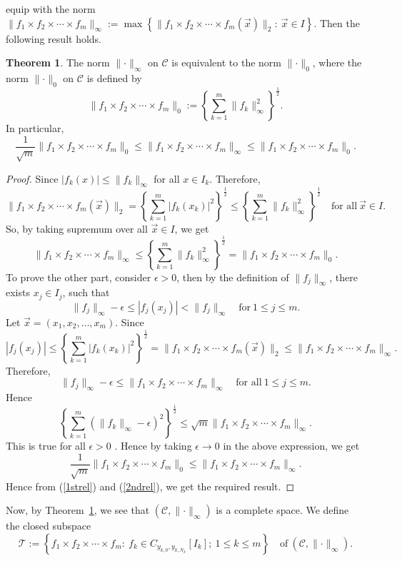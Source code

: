 \documentclass[10pt]{amsart}
\theoremstyle{definition}
\newtheorem{thm}{Theorem}[section]
\newcommand{\myseries}[3]{#1\leq #2\leq #3}
\newcommand{\myvec}[3]{#1=(#2_1,#2_2,\ldots,#2_#3)}
\newcommand{\norm}[2]{\lVert #1 \rVert_#2}
\newcommand{\profunc}[1]{#1_1\times#1_2\times\cdots\times#1_m}
\begin{document}
	equip with the norm $\norm{\profunc{f}}{\infty}:=\max\left\{\norm{\profunc{f}(\vec{x})}{2}:~\vec{x}\in I\right\}$. Then the following result holds.
	\begin{thm}\label{rbnonfs}
		The norm $\norm{\cdot}{\infty}$ on $\mathscr{C}$ is equivalent to the norm $\norm{\cdot}{0}$, where the norm $\norm{\cdot}{0}$ on $\mathscr{C}$ is defined by 
		$$\norm{\profunc{f}}{0}:=\left\{\sum_{k=1}^{m}\norm{f_k}{\infty}^2\right\}^{\frac{1}{2}}.$$
		In particular, $$\frac{1}{\sqrt{m}}\norm{\profunc{f}}{0}\leq \norm{\profunc{f}}{\infty}\leq \norm{\profunc{f}}{0}.$$
	\end{thm}
	\begin{proof}
		Since $|f_k(x)|\leq \norm{f_k}{\infty}$ for all $x\in I_k$. Therefore,
		$$\norm{\profunc{f}(\vec{x})}{2}=\left\{\sum_{k=1}^{m}|{f_k}(x_k)|^2\right\}^{\frac{1}{2}}\leq \left\{\sum_{k=1}^{m}\norm{f_k}{\infty}^2\right\}^{\frac{1}{2}}\quad\mbox{for all}~\vec{x}\in I.$$
		So, by taking supremum over all $\vec{x}\in I$, we get
		\begin{equation} 
			\norm{\profunc{f}}{\infty}\leq \left\{\sum_{k=1}^{m}\norm{f_k}{\infty}^2\right\}^{\frac{1}{2}}=\norm{\profunc{f}}{0}. \label{1strel}
		\end{equation}
		To prove the other part, consider $\epsilon>0$, then by the definition of $\norm{f_j}{\infty}$, there exists $x_j\in I_j$, such that 
		$$\norm{f_j}{\infty}-\epsilon\leq |f_j(x_j)|<\norm{f_j}{\infty}\quad\mbox{for}~\myseries{1}{j}{m}.$$
		Let $\myvec{\vec{x}}{x}{m}$. Since $$|f_j(x_j)|\leq \left\{\sum_{k=1}^{m}|{f_k}(x_k)|^2\right\}^{\frac{1}{2}}=\norm{\profunc{f}(\vec{x})}{2}\leq \norm{\profunc{f}}{\infty}.$$ 
		Therefore, 
		$$\norm{f_j}{\infty}-\epsilon\leq \norm{\profunc{f}}{\infty}\quad\mbox{for all}~ \myseries{1}{j}{m}.$$
		Hence
		$$\left\{\sum_{k=1}^{m}(\norm{f_k}{\infty}-\epsilon)^2\right\}^{\frac{1}{2}}\leq \sqrt{m}\norm{\profunc{f}}{\infty}.$$
		This is true for all $\epsilon>0$ . Hence by taking $\epsilon\rightarrow 0$ in the above expression, we get 
		\begin{equation}
			\frac{1}{\sqrt{m}}\norm{\profunc{f}}{0}\leq \norm{\profunc{f}}{\infty}. \label{2ndrel}
		\end{equation}
		Hence from (\ref{1strel}) and (\ref{2ndrel}), we get the required result.
	\end{proof}
	
	Now, by Theorem~\ref{rbnonfs}, we see that $(\mathscr{C},\norm{\cdot}{\infty})$ is a complete space. We define the closed subspace $$\mathscr{T}:=\left\{\profunc{f}:~f_k\in C_{y_{k,0},y_{k,N_k}}[I_k];~\myseries{1}{k}{m} \right\}\quad\mbox{of}~(\mathscr{C},\norm{\cdot}{\infty}).$$ 
	
\end{document}
